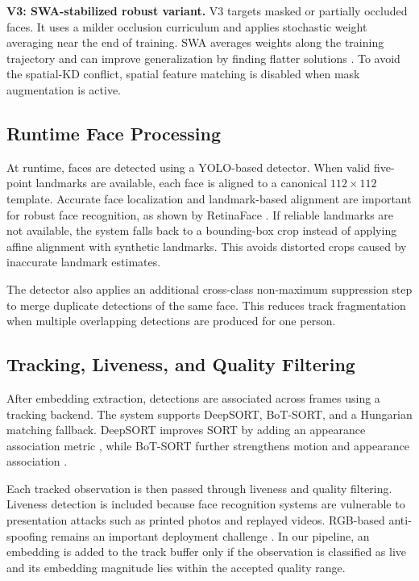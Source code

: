 \textbf{V3: SWA-stabilized robust variant.}
V3 targets masked or partially occluded faces. It uses a milder occlusion curriculum and applies stochastic weight averaging near the end of training. SWA averages weights along the training trajectory and can improve generalization by finding flatter solutions \cite{izmailov2019averagingweightsleadswider}. To avoid the spatial-KD conflict, spatial feature matching is disabled when mask augmentation is active.

\subsection{Runtime Face Processing}

At runtime, faces are detected using a YOLO-based detector\cite{yolo11_ultralytics}. When valid five-point landmarks are available, each face is aligned to a canonical $112 \times 112$ template. Accurate face localization and landmark-based alignment are important for robust face recognition, as shown by RetinaFace \cite{retinaface}. If reliable landmarks are not available, the system falls back to a bounding-box crop instead of applying affine alignment with synthetic landmarks. This avoids distorted crops caused by inaccurate landmark estimates.

The detector also applies an additional cross-class non-maximum suppression step to merge duplicate detections of the same face. This reduces track fragmentation when multiple overlapping detections are produced for one person.

\subsection{Tracking, Liveness, and Quality Filtering}

After embedding extraction, detections are associated across frames using a tracking backend. The system supports DeepSORT, BoT-SORT, and a Hungarian matching fallback. DeepSORT improves SORT by adding an appearance association metric \cite{deepsort}, while BoT-SORT further strengthens motion and appearance association \cite{botsort}.

Each tracked observation is then passed through liveness and quality filtering. Liveness detection is included because face recognition systems are vulnerable to presentation attacks such as printed photos and replayed videos. RGB-based anti-spoofing remains an important deployment challenge \cite{ming2020surveyantispoofingmethodsface}. In our pipeline, an embedding is added to the track buffer only if the observation is classified as live and its embedding magnitude lies within the accepted quality range.

